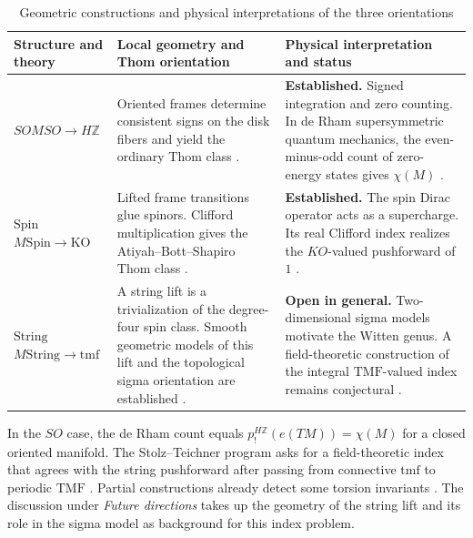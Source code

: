 \documentclass[11pt]{article}
\theoremstyle{definition}
\newcommand{\KO}{\mathrm{KO}}
\newcommand{\tmf}{\mathrm{tmf}}
\newcommand{\Z}{\mathbb Z}
\newcommand{\Spin}{\mathrm{Spin}}
\newcommand{\String}{\mathrm{String}}
\begin{document}
\begin{table}[!htbp]
\centering
\caption{Geometric constructions and physical interpretations of the three orientations}
\label{tab:orientation-status}
\small
\renewcommand{\arraystretch}{1.2}
\setlength{\tabcolsep}{6pt}
\begin{tabularx}{\linewidth}{@{}>{\raggedright\arraybackslash}p{.17\linewidth}%
    >{\raggedright\arraybackslash}X>{\raggedright\arraybackslash}X@{}}
\toprule
\textbf{Structure and theory} &
\textbf{Local geometry and Thom orientation} &
\textbf{Physical interpretation and status}\\
\midrule
\textbf{\(SO\)}\newline \(M SO\to H\Z\) &
Oriented frames determine consistent signs on the disk fibers and yield the ordinary Thom class \cite{MS}. &
\textbf{Established.} Signed integration and zero counting. In de Rham supersymmetric quantum mechanics, the even-minus-odd count of zero-energy states gives \(\chi(M)\) \cite{Wm}.\\
\addlinespace[4pt]
\textbf{\(\Spin\)}\newline \(M\Spin\to\KO\) &
Lifted frame transitions glue spinors. Clifford multiplication gives the Atiyah--Bott--Shapiro Thom class \cite{ABS,AHR}. &
\textbf{Established.} The spin Dirac operator acts as a supercharge. Its real Clifford index realizes the \(KO\)-valued pushforward of \(1\) \cite{BEKO,TYK}.\\
\addlinespace[4pt]
\rowcolor{blue!7}
\textbf{\(\String\)}\newline \(M\String\to\tmf\) &
A string lift is a trivialization of the degree-four spin class. Smooth geometric models of this lift and the topological sigma orientation are established \cite{Redden,WaldorfString,AHR}. &
\textbf{Open in general.} Two-dimensional sigma models motivate the Witten genus. A field-theoretic construction of the integral \(\mathrm{TMF}\)-valued index remains conjectural \cite{ST,BE}.\\
\bottomrule
\end{tabularx}
\end{table}

In the \(SO\) case, the de Rham count equals \(p_!^{H\Z}(e(TM))=\chi(M)\) for a closed oriented manifold. The Stolz--Teichner program asks for a field-theoretic index that agrees with the string pushforward after passing from connective \(\tmf\) to periodic \(\mathrm{TMF}\) \cite{ST,BE}. Partial constructions already detect some torsion invariants \cite{BETorsion}. The discussion under \emph{Future directions} takes up the geometry of the string lift and its role in the sigma model as background for this index problem.
\end{document}
